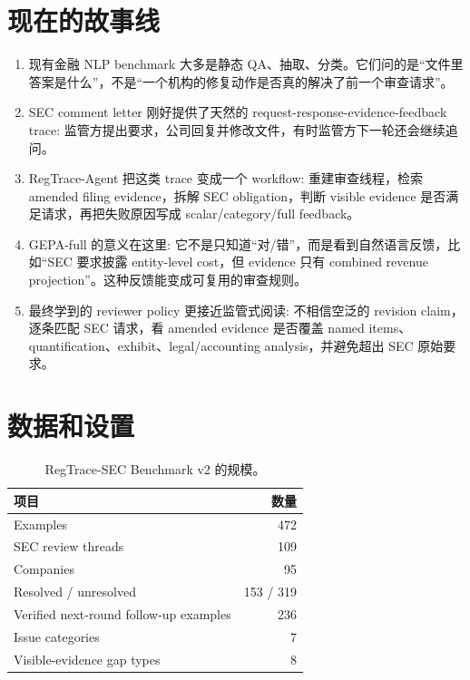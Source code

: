 \documentclass[11pt,fontset=none]{ctexart}
\begin{document}
\section*{现在的故事线}

\begin{enumerate}[leftmargin=1.6em,itemsep=0.25em]
    \item 现有金融 NLP benchmark 大多是静态 QA、抽取、分类。它们问的是``文件里答案是什么''，不是``一个机构的修复动作是否真的解决了前一个审查请求''。
    \item SEC comment letter 刚好提供了天然的 request-response-evidence-feedback trace: 监管方提出要求，公司回复并修改文件，有时监管方下一轮还会继续追问。
    \item RegTrace-Agent 把这类 trace 变成一个 workflow: 重建审查线程，检索 amended filing evidence，拆解 SEC obligation，判断 visible evidence 是否满足请求，再把失败原因写成 scalar/category/full feedback。
    \item GEPA-full 的意义在这里: 它不是只知道``对/错''，而是看到自然语言反馈，比如``SEC 要求披露 entity-level cost，但 evidence 只有 combined revenue projection''。这种反馈能变成可复用的审查规则。
    \item 最终学到的 reviewer policy 更接近监管式阅读: 不相信空泛的 revision claim，逐条匹配 SEC 请求，看 amended evidence 是否覆盖 named items、quantification、exhibit、legal/accounting analysis，并避免超出 SEC 原始要求。
\end{enumerate}

\section*{数据和设置}

\begin{table}[h]
\centering
\small
\begin{tabular}{lr}
\toprule
\textbf{项目} & \textbf{数量} \\
\midrule
Examples & 472 \\
SEC review threads & 109 \\
Companies & 95 \\
Resolved / unresolved & 153 / 319 \\
Verified next-round follow-up examples & 236 \\
Issue categories & 7 \\
Visible-evidence gap types & 8 \\
\bottomrule
\end{tabular}
\caption{RegTrace-SEC Benchmark v2 的规模。}
\end{table}
\end{document}
